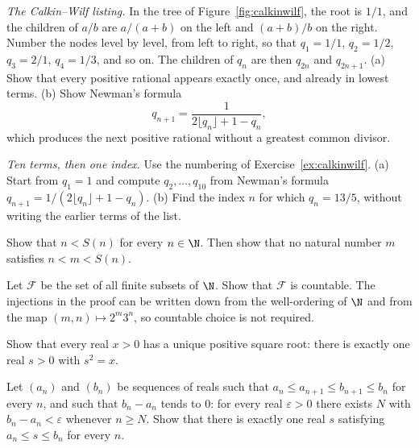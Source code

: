 \begin{exercise}[$\star\star\star$]\label{ex:calkinwilf}
\emph{The Calkin--Wilf listing.} In the tree of Figure~\ref{fig:calkinwilf}, the root is $1/1$, and the children of $a/b$ are $a/(a+b)$ on the left and $(a+b)/b$ on the right. Number the nodes level by level, from left to right, so that $q_1=1/1$, $q_2=1/2$, $q_3=2/1$, $q_4=1/3$, and so on. The children of $q_n$ are then $q_{2n}$ and $q_{2n+1}$. (a) Show that every positive rational appears exactly once, and already in lowest terms. (b) Show Newman's formula
\[
q_{n+1}=\dfrac{1}{2\lfloor q_n\rfloor +1-q_n},
\]
which produces the next positive rational without a greatest common divisor.
\end{exercise}

\begin{exercise}[$\star$]\label{ex:cwcompute}
\emph{Ten terms, then one index.} Use the numbering of Exercise~\ref{ex:calkinwilf}. (a) Start from $q_1=1$ and compute $q_2,\ldots,q_{10}$ from Newman's formula $q_{n+1}=1/(2\lfloor q_n\rfloor+1-q_n)$. (b) Find the index $n$ for which $q_n=13/5$, without writing the earlier terms of the list.
\end{exercise}

\begin{exercise}[$\star$]\label{ex:v7c01a}
Show that $n<S(n)$ for every $n\in\N$. Then show that no natural number $m$ satisfies $n<m<S(n)$.
\end{exercise}

\begin{exercise}[$\star\star$]\label{ex:v7c01b}
Let $\mathcal F$ be the set of all finite subsets of $\N$. Show that $\mathcal F$ is countable. The injections in the proof can be written down from the well-ordering of $\N$ and from the map $(m,n)\mapsto 2^m 3^n$, so countable choice is not required.
\end{exercise}

\begin{exercise}[$\star\star$]\label{ex:v7c01c}
Show that every real $x>0$ has a unique positive square root: there is exactly one real $s>0$ with $s^2=x$.
\end{exercise}

\begin{exercise}[$\star\star$]\label{ex:v7c01d}
Let $(a_n)$ and $(b_n)$ be sequences of reals such that $a_n\le a_{n+1}\le b_{n+1}\le b_n$ for every $n$, and such that $b_n-a_n$ tends to $0$: for every real $\varepsilon>0$ there exists $N$ with $b_n-a_n<\varepsilon$ whenever $n\ge N$. Show that there is exactly one real $s$ satisfying $a_n\le s\le b_n$ for every $n$.
\end{exercise}

